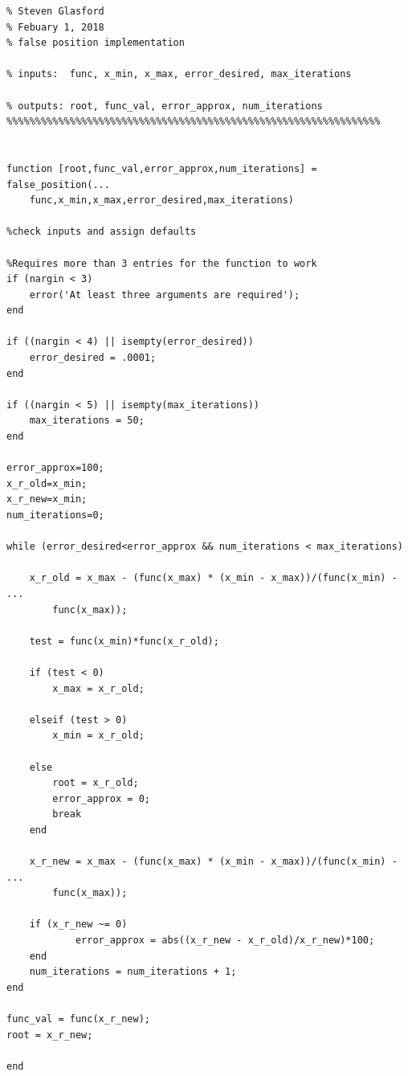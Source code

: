 \documentclass[11pt]{article}
\begin{document}
\begin{lstlisting}[caption={MATLAB code for false_position}, label = {code:false},frame=tb]
%%%%%%%%%%%%%%%%%%%%%%%%%%%%%%%%%%%%%%%%%%%%%%%%%%%%%%%%%%%%%%%%%
% Steven Glasford
% Febuary 1, 2018
% false position implementation 

% inputs:  func, x_min, x_max, error_desired, max_iterations

% outputs: root, func_val, error_approx, num_iterations
%%%%%%%%%%%%%%%%%%%%%%%%%%%%%%%%%%%%%%%%%%%%%%%%%%%%%%%%%%%%%%%%%


function [root,func_val,error_approx,num_iterations] = false_position(...
    func,x_min,x_max,error_desired,max_iterations)

%check inputs and assign defaults

%Requires more than 3 entries for the function to work
if (nargin < 3)
    error('At least three arguments are required');
end

if ((nargin < 4) || isempty(error_desired))
    error_desired = .0001;
end

if ((nargin < 5) || isempty(max_iterations))
    max_iterations = 50;
end

error_approx=100;
x_r_old=x_min;
x_r_new=x_min;
num_iterations=0;

while (error_desired<error_approx && num_iterations < max_iterations)
    
    x_r_old = x_max - (func(x_max) * (x_min - x_max))/(func(x_min) - ...
        func(x_max));
    
    test = func(x_min)*func(x_r_old);
    
    if (test < 0)
        x_max = x_r_old;
           
    elseif (test > 0)
        x_min = x_r_old;
        
    else
        root = x_r_old;
        error_approx = 0;
        break
    end
    
    x_r_new = x_max - (func(x_max) * (x_min - x_max))/(func(x_min) - ...
        func(x_max));
    
    if (x_r_new ~= 0)
            error_approx = abs((x_r_new - x_r_old)/x_r_new)*100;
    end 
    num_iterations = num_iterations + 1;
end

func_val = func(x_r_new);
root = x_r_new;

end
\end{lstlisting}
\end{document}
